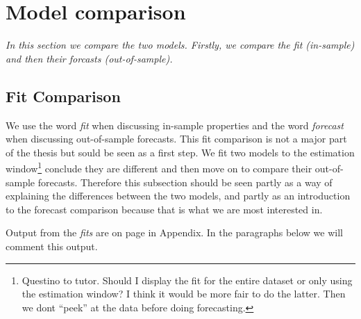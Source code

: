 


\newpage

\section{Model comparison}\label{model-comparison}

\emph{In this section we compare the two models. Firstly, we compare the fit (in-sample) and then their forcasts (out-of-sample).}

\subsection{Fit Comparison}\label{fit-comparison}

We use the word \emph{fit} when discussing in-sample properties and the word \emph{forecast} when discussing out-of-sample forecasts. This fit comparison is not a major part of the thesis but sould be seen as a first step. We fit two models to the estimation window\footnote{Questino to tutor. Should I display the fit for the entire dataset or only using the estimation window? I think it would be more fair to do the latter. Then we dont ``peek'' at the data before doing forecasting.} conclude they are different and then move on to compare their out-of-sample forecasts. Therefore this subsection should be seen partly as a way of explaining the differences between the two models, and partly as an introduction to the forecast comparison because that is what we are most interested in.

Output  from the \emph{fits} are on page \pageref{sec-fit.acd-fit.garch.r} in Appendix. In the paragraphs below we will comment this output.
